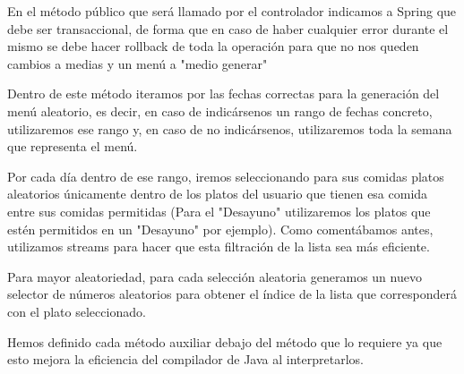 \documentclass[12pt, a4paper, twoside]{book}
\begin{document}
	En el método público que será llamado por el controlador indicamos a Spring que debe ser transaccional, de forma que en caso de haber cualquier error durante el mismo se debe hacer rollback de toda la operación para que no nos queden cambios a medias y un menú a "medio generar"
	
	Dentro de este método iteramos por las fechas correctas para la generación del menú aleatorio, es decir, en caso de indicársenos un rango de fechas concreto, utilizaremos ese rango y, en caso de no indicársenos, utilizaremos toda la semana que representa el menú.
	
	Por cada día dentro de ese rango, iremos seleccionando para sus comidas platos aleatorios únicamente dentro de los platos del usuario que tienen esa comida entre sus comidas permitidas (Para el "Desayuno" utilizaremos los platos que estén permitidos en un "Desayuno" por ejemplo). Como comentábamos antes, utilizamos streams para hacer que esta filtración de la lista sea más eficiente.
	
	Para mayor aleatoriedad, para cada selección aleatoria generamos un nuevo selector de números aleatorios para obtener el índice de la lista que corresponderá con el plato seleccionado.
	
	Hemos definido cada método auxiliar debajo del método que lo requiere ya que esto mejora la eficiencia del compilador de Java al interpretarlos.
	
\end{document}
